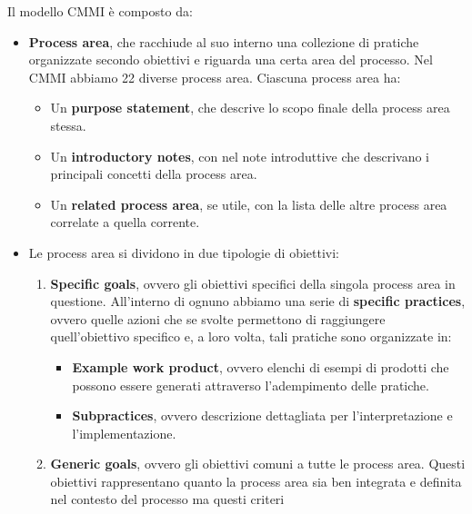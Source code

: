 Il modello CMMI è composto da:
\begin{itemize}
    \item \textbf{Process area}, che racchiude al suo interno una collezione di
          pratiche organizzate secondo obiettivi e riguarda una certa area del processo.
          Nel CMMI abbiamo 22 diverse process area. Ciascuna process area ha:
          \begin{itemize}
              \item Un \textbf{purpose statement}, che descrive lo scopo finale della
                    process area stessa.
              \item Un \textbf{introductory notes}, con nel note introduttive che
                    descrivano i principali concetti della process area.
              \item Un \textbf{related process area}, se utile, con la lista delle altre
                    process area correlate a quella corrente.
          \end{itemize}
    \item Le process area si dividono in due tipologie di obiettivi:
          \begin{enumerate}
              \item \textbf{Specific goals}, ovvero gli obiettivi specifici della
                    singola process area in questione. All'interno di ognuno abbiamo una
                    serie di \textbf{specific practices}, ovvero quelle azioni che se svolte
                    permettono di raggiungere quell'obiettivo specifico e, a loro volta, tali
                    pratiche sono organizzate in:
                    \begin{itemize}
                        \item \textbf{Example work product}, ovvero elenchi di esempi di
                              prodotti che possono essere generati attraverso l'adempimento delle
                              pratiche.
                        \item \textbf{Subpractices}, ovvero descrizione dettagliata per
                              l'interpretazione e l'implementazione.
                    \end{itemize}
              \item \textbf{Generic goals}, ovvero gli obiettivi comuni a tutte le
                    process area. Questi obiettivi rappresentano quanto la process area sia
                    ben integrata e definita nel contesto del processo ma questi criteri

\end{enumerate}
\end{itemize}
